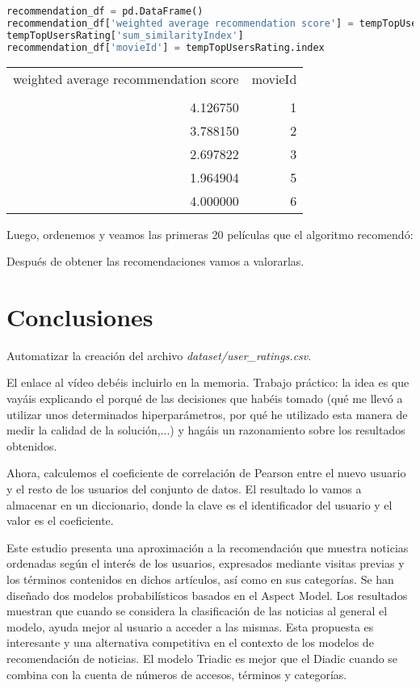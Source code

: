 \documentclass{uimppracticas}
\begin{document}
\begin{lstlisting}[language=python, basicstyle=\small]
recommendation_df = pd.DataFrame()
recommendation_df['weighted average recommendation score'] = tempTopUsersRating['sum_weightedRating'] / \
tempTopUsersRating['sum_similarityIndex']
recommendation_df['movieId'] = tempTopUsersRating.index
\end{lstlisting}

\begin{tabular}{rr}
	\toprule
	weighted average recommendation score &  movieId \\
	&          \\
	\midrule
	4.126750 &        1 \\
	3.788150 &        2 \\
	2.697822 &        3 \\
	1.964904 &        5 \\
	4.000000 &        6 \\
	\bottomrule
\end{tabular}


Luego, ordenemos y veamos las primeras 20 películas que el algoritmo recomendó:




Después de obtener las recomendaciones vamos a valorarlas. 

\newpage

\section{Conclusiones}

Automatizar la creación del archivo \textit{dataset/user\_ratings.csv}.

El enlace al vídeo debéis incluirlo en la memoria. Trabajo práctico: la idea es que vayáis explicando el porqué de las decisiones que habéis tomado (qué me llevó a utilizar unos determinados hiperparámetros, por qué he utilizado esta manera de medir la calidad de la solución,...) y hagáis un razonamiento sobre los resultados obtenidos.

Ahora, calculemos el coeficiente de correlación de Pearson entre el nuevo usuario y el resto de los usuarios del conjunto de datos. El resultado lo vamos a almacenar en un diccionario, donde la clave es el identificador del usuario y el valor es el coeficiente.


Este estudio presenta una aproximación a la recomendación que muestra
noticias ordenadas según el interés de los usuarios, expresados mediante
visitas previas y los términos contenidos en dichos artículos, así como en sus
categorías.
Se han diseñado dos modelos probabilísticos basados en el Aspect Model.
Los resultados muestran que cuando se considera la clasificación de las
noticias al general el modelo, ayuda mejor al usuario a acceder a las mismas.
Esta propuesta es interesante y una alternativa competitiva en el contexto de
los modelos de recomendación de noticias.
El modelo Triadic es mejor que el Diadic cuando se combina con la cuenta de
números de accesos, términos y categorías.


\newpage

\renewcommand{\refname}{Bibliografía}


	
\end{document}
